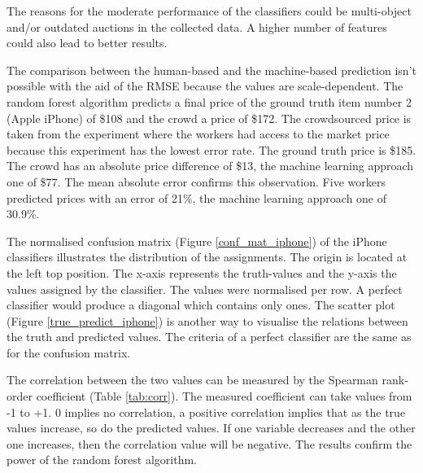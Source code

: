 The reasons for the moderate performance of the classifiers could be multi-object and/or outdated auctions in the collected data. A higher number of features could also lead to better results.

The comparison between the human-based and the machine-based prediction isn't possible with the aid of the RMSE because the values are scale-dependent. The random forest algorithm predicts a final price of the ground truth item number 2 (Apple iPhone) of \$108 and the crowd a price of \$172. The crowdsourced price is taken from the experiment where the workers had access to the market price because this experiment has the lowest error rate. The ground truth price is \$185. The crowd has an absolute price difference of \$13, the machine learning approach one of \$77. The mean absolute error confirms this observation. Five workers predicted prices with an error of 21\%, the machine learning approach one of 30.9\%.

The normalised confusion matrix (Figure \ref{conf_mat_iphone}) of the iPhone classifiers illustrates the distribution of the assignments. The origin is located at the left top position. The x-axis represents the truth-values and the y-axis the values assigned by the classifier. The values were normalised per row. A perfect classifier would produce a diagonal which contains only ones. 
The scatter plot (Figure \ref{true_predict_iphone}) is another way to visualise the relations between the truth and predicted values. The criteria of a perfect classifier are the same as for the confusion matrix.

The correlation between the two values can be measured by the Spearman rank-order coefficient (Table \ref{tab:corr}). The measured coefficient can take values from -1 to +1. 0 implies no correlation, a positive correlation implies that as the true values increase, so do the predicted values. If one variable decreases and the other one increases, then the correlation value will be negative. The results confirm the power of the random forest algorithm.

